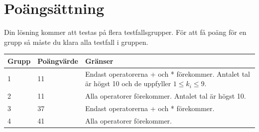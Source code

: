 \section*{Poängsättning}
Din lösning kommer att testas på flera testfallsgrupper. För att få poäng för en grupp
så måste du klara alla testfall i gruppen.

\begin{tabular}{| l | l | l |}
\hline
Grupp & Poängvärde & Gränser \\ \hline
1     & 11         & Endast operatorerna + och * förekommer. Antalet tal är högst 10 och de uppfyller $1\leq k_i \leq 9$. \\
2     & 11         & Alla operatorer förekommer. Antalet tal är högst 10. \\
3     & 37         & Endast operatorerna + och * förekommer.\\ 
4     & 41         & Alla operatorer förekommer. \\ \hline
\end{tabular}


